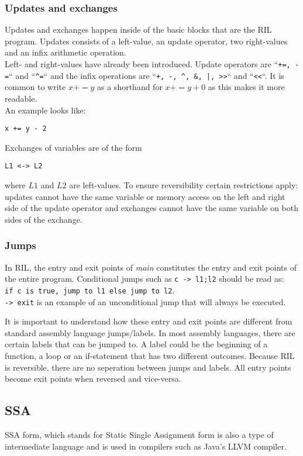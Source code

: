 \subsubsection{Updates and exchanges}
Updates and exchanges happen inside of the basic blocks that are the RIL program.
Updates consists of a left-value, an update operator, two right-values and an infix arithmetic operation. \\
Left- and right-values have already been introduced. Update operators are ``\lstinline{+=, -=}`` and ``\lstinline{^=}`` and the infix operations are ``\lstinline{+, -, ^, &, |, >>}`` and ``\lstinline{<<}``. It is common to write $x += y$ as a shorthand for $x += y + 0$ as this makes it more readable. \\
An example looks like:
\begin{verbatim}
x += y - 2
\end{verbatim}
Exchanges of variables are of the form
\begin{verbatim}
L1 <-> L2
\end{verbatim}
where $L1$ and $L2$ are left-values.
To ensure reversibility certain restrictions apply:
updates cannot have the same variable or memory access on the left and right side of the update operator and exchanges cannot have the same variable on both sides of the exchange.

\subsubsection{Jumps}
In RIL, the entry and exit points of \emph{main} constitutes the entry and exit points of the entire program. Conditional jumps such as \lstinline{c -> l1;l2} should be read as: \\
\lstinline{if c is true, jump to l1 else jump to l2}. \\
\lstinline{-> exit} is an example of an unconditional jump that will always be executed.

It is important to understand how these entry and exit points are different from standard assembly language jumps/labels.
In most assembly languages, there are certain labels that can be jumped to.
A label could be the beginning of a function, a loop or an if-statement that has two different outcomes.
Because RIL is reversible, there are no seperation between jumps and labels.
All entry points become exit points when reversed and vice-versa.


\subsection{SSA}
SSA form, which stands for Static Single Assignment form is also a type of intermediate language and is used in compilers such as Java's LLVM compiler\cite{llvm_memory_SSA}.

